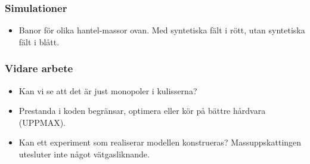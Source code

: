 \documentclass[aspectratio=169]{beamer}
\begin{document}
\begin{frame}
        \frametitle{Simulationer}
    \begin{figure}[h]
        \centering
        \qquad  
    \end{figure}
    \begin{itemize}
            \item Banor för olika hantel-massor ovan. Med syntetiska fält i rött, utan syntetiska fält i blått.
    \end{itemize}
\end{frame}
\begin{frame}
        \frametitle{Vidare arbete}
        \begin{itemize}
                \item  Kan vi se att det är just
                        monopoler i kulisserna?
                \item Prestanda i koden begränsar,
                        optimera eller kör på bättre
                        hårdvara (UPPMAX).
                \item Kan ett experiment som realiserar
                        modellen konstrueras?
                        Massuppskattingen utesluter inte
                        något vätgasliknande.
        \end{itemize}
\end{frame}
\end{document}
